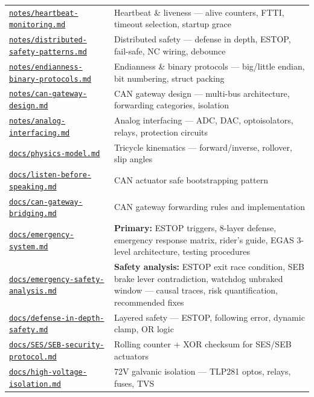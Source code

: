 \begin{longtable}[]{@{}
  >{\raggedright\arraybackslash}p{}
  >{\raggedright\arraybackslash}p{}@{}}
\href{notes/heartbeat-monitoring.md}{\texttt{notes/heartbeat-monitoring.md}} &
Heartbeat \& liveness --- alive counters, FTTI, timeout selection, startup
grace \\
\href{notes/distributed-safety-patterns.md}{\texttt{notes/distributed-safety-patterns.md}}
& Distributed safety --- defense in depth, ESTOP, fail-safe, NC wiring,
debounce \\
\href{notes/endianness-binary-protocols.md}{\texttt{notes/endianness-binary-protocols.md}}
& Endianness \& binary protocols --- big/little endian, bit numbering, struct
packing \\
\href{notes/can-gateway-design.md}{\texttt{notes/can-gateway-design.md}} & CAN
gateway design --- multi-bus architecture, forwarding categories, isolation \\
\href{notes/analog-interfacing.md}{\texttt{notes/analog-interfacing.md}} &
Analog interfacing --- ADC, DAC, optoisolators, relays, protection circuits \\
\href{docs/physics-model.md}{\texttt{docs/physics-model.md}} & Tricycle
kinematics --- forward/inverse, rollover, slip angles \\
\href{docs/listen-before-speaking.md}{\texttt{docs/listen-before-speaking.md}} &
CAN actuator safe bootstrapping pattern \\
\href{docs/can-gateway-bridging.md}{\texttt{docs/can-gateway-bridging.md}} & CAN
gateway forwarding rules and implementation \\
\href{docs/emergency-system.md}{\texttt{docs/emergency-system.md}} &
\textbf{Primary:} ESTOP triggers, 8-layer defense, emergency response matrix,
rider's guide, EGAS 3-level architecture, testing procedures \\
\href{docs/emergency-safety-analysis.md}{\texttt{docs/emergency-safety-analysis.md}}
& \textbf{Safety analysis:} ESTOP exit race condition, SEB brake lever
contradiction, watchdog unbraked window --- causal traces, risk quantification,
recommended fixes \\
\href{docs/defense-in-depth-safety.md}{\texttt{docs/defense-in-depth-safety.md}}
& Layered safety --- ESTOP, following error, dynamic clamp, OR logic \\
\href{docs/SES/SEB-security-protocol.md}{\texttt{docs/SES/SEB-security-protocol.md}}
& Rolling counter + XOR checksum for SES/SEB actuators \\
\href{docs/high-voltage-isolation.md}{\texttt{docs/high-voltage-isolation.md}} &
72V galvanic isolation --- TLP281 optos, relays, fuses, TVS \\

\end{longtable}
